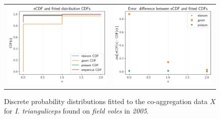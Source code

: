 \documentclass{article}
\begin{document}
\begin{figure}[]
	\begin{mdframed}[backgroundcolor=grey250,rightline=false,leftline=false,topline=false]
	\centering
	\begin{tabular}{ll}
	\includegraphics[width=.48\linewidth,valign=m]{CDF_compare_2005_I.trianguliceps_FV} & \includegraphics[width=.48\linewidth,valign=m]{CDF_errors_2005_I.trianguliceps_FV}
	\end{tabular}
		\caption{Discrete probability distributions fitted to the co-aggregation data $ X $ for \textit{I. trianguliceps} found on \textit{field voles} in \textit{2005}.}
	\label{fig:CDF_2005_itrianguliceps_FV}
	\end{mdframed}
\end{figure}
\end{document}
